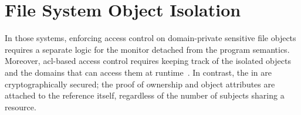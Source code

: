 \section{File System Object Isolation}\label{sec:ref-mon}\label{sec:design:ref-mon}\label{sec:design:file-path}






In those systems, enforcing access control on domain-private sensitive file objects requires a separate logic for the monitor detached from the program semantics.
Moreover, \gls{acl}-based access control requires keeping track of the isolated objects and the domains that can access them at runtime~\cite{jenny}.
In contrast, the \fds in \thename are cryptographically secured; the proof of ownership and object attributes are attached to the reference itself, regardless of the number of subjects sharing a resource.

